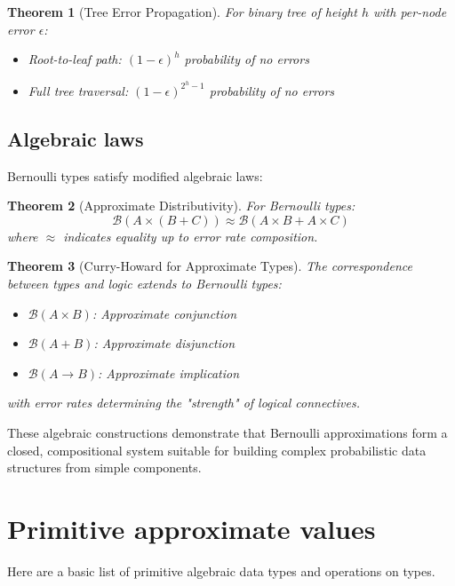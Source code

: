 \documentclass[11pt,final,hidelinks]{article}
\newcommand{\Ber}[1]{\mathcal{B}(#1)}  %
\theoremstyle{plain}
\newtheorem{theorem}{Theorem}[section]
\begin{document}
\begin{theorem}[Tree Error Propagation]
For binary tree of height $h$ with per-node error $\epsilon$:
\begin{itemize}
\item Root-to-leaf path: $(1-\epsilon)^h$ probability of no errors
\item Full tree traversal: $(1-\epsilon)^{2^h - 1}$ probability of no errors
\end{itemize}
\end{theorem}

\subsection{Algebraic laws}

Bernoulli types satisfy modified algebraic laws:

\begin{theorem}[Approximate Distributivity]
For Bernoulli types:
\begin{equation}
\Ber{A \times (B + C)} \approx \Ber{A \times B + A \times C}
\end{equation}
where $\approx$ indicates equality up to error rate composition.
\end{theorem}

\begin{theorem}[Curry-Howard for Approximate Types]
The correspondence between types and logic extends to Bernoulli types:
\begin{itemize}
\item $\Ber{A \times B}$: Approximate conjunction
\item $\Ber{A + B}$: Approximate disjunction
\item $\Ber{A \to B}$: Approximate implication
\end{itemize}
with error rates determining the "strength" of logical connectives.
\end{theorem}

These algebraic constructions demonstrate that Bernoulli approximations form a closed, compositional system suitable for building complex probabilistic data structures from simple components.

\section{Primitive approximate values}
\label{sec:primitives}
Here are a basic list of primitive algebraic data types and operations on types.
\end{document}
